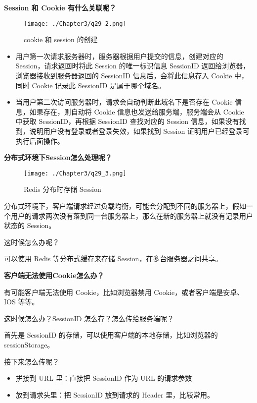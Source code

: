 \documentclass[cn,11pt,color=blue,lang=cn]{elegantbook}
\begin{document}
\begin{solution}
\begin{note} \textbf{Session 和 Cookie 有什么关联呢？} \end{note}
\begin{figure}[htbp]
\centering
\texttt{[image: ./Chapter3/q29\_2.png]}
\caption{cookie 和 session 的创建}
\label{fig29_2}
\end{figure}
\begin{itemize}
	\item 用户第一次请求服务器时，服务器根据用户提交的信息，创建对应的 Session，请求返回时将此 Session 的唯一标识信息 SessionID 返回给浏览器，浏览器接收到服务器返回的 SessionID 信息后，会将此信息存入 Cookie 中，同时 Cookie 记录此 SessionID 是属于哪个域名。
	\item 当用户第二次访问服务器时，请求会自动判断此域名下是否存在 Cookie 信息，如果存在，则自动将 Cookie 信息也发送给服务端，服务端会从 Cookie 中获取 SessionID，再根据 SessionID 查找对应的 Session 信息，如果没有找到，说明用户没有登录或者登录失效，如果找到 Session 证明用户已经登录可执行后面操作。
\end{itemize}

\begin{note} \textbf{分布式环境下Session怎么处理呢？} \end{note}
\begin{figure}[htbp]
\centering
\texttt{[image: ./Chapter3/q29\_3.png]}
\caption{Redis 分布时存储 Session}
\label{fig29_3}
\end{figure}

分布式环境下，客户端请求经过负载均衡，可能会分配到不同的服务器上，假如一个用户的请求两次没有落到同一台服务器上，那么在新的服务器上就没有记录用户状态的 Session。

这时候怎么办呢？

可以使用 Redis 等分布式缓存来存储 Session，在多台服务器之间共享。
\begin{note} \textbf{客户端无法使用Cookie怎么办？} \end{note}

有可能客户端无法使用 Cookie，比如浏览器禁用 Cookie，或者客户端是安卓、IOS 等等。

这时候怎么办？SessionID 怎么存？怎么传给服务端呢？

首先是 SessionID 的存储，可以使用客户端的本地存储，比如浏览器的 sessionStorage。

接下来怎么传呢？
\begin{itemize}
	\item 拼接到 URL 里：直接把 SessionID 作为 URL 的请求参数
	\item 放到请求头里：把 SessionID 放到请求的 Header 里，比较常用。
\end{itemize}

\end{solution}
\end{document}
